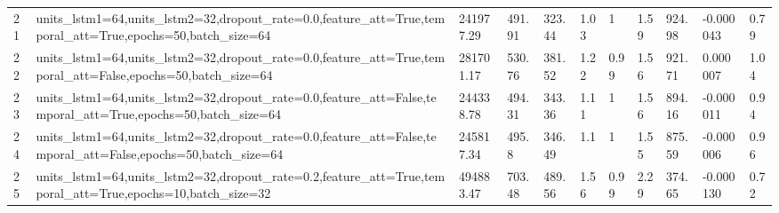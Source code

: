 \begin{longtable}{C{0.8cm} L{2cm} C{1.15cm} C{1.15cm} C{1.15cm} C{1.15cm} C{0.85cm} C{1.25cm} C{1.2cm} C{1.5cm} C{1.0cm}}
21 & units\_lstm1=64,\newline units\_lstm2=32,\newline dropout\_rate=0.0,\newline feature\_att=True,\newline temporal\_att=True,\newline epochs=50,\newline batch\_size=64 & 241977.29 & 491.91 & 323.44 & 1.03 & 1 & 1.59 & 924.98 & -0.000043 & 0.79 \\
22 & units\_lstm1=64,\newline units\_lstm2=32,\newline dropout\_rate=0.0,\newline feature\_att=True,\newline temporal\_att=False,\newline epochs=50,\newline batch\_size=64 & 281701.17 & 530.76 & 381.52 & 1.22 & 0.99 & 1.56 & 921.71 & 0.000007 & 1.04 \\
23 & units\_lstm1=64,\newline units\_lstm2=32,\newline dropout\_rate=0.0,\newline feature\_att=False,\newline temporal\_att=True,\newline epochs=50,\newline batch\_size=64 & 244338.78 & 494.31 & 343.36 & 1.11 & 1 & 1.56 & 894.16 & -0.000011 & 0.94 \\
24 & units\_lstm1=64,\newline units\_lstm2=32,\newline dropout\_rate=0.0,\newline feature\_att=False,\newline temporal\_att=False,\newline epochs=50,\newline batch\_size=64 & 245817.34 & 495.8 & 346.49 & 1.1 & 1 & 1.55 & 875.59 & -0.000006 & 0.96 \\
25 & units\_lstm1=64,\newline units\_lstm2=32,\newline dropout\_rate=0.2,\newline feature\_att=True,\newline temporal\_att=True,\newline epochs=10,\newline batch\_size=32 & 494883.47 & 703.48 & 489.56 & 1.56 & 0.99 & 2.29 & 374.65 & -0.000130 & 0.72 \\

\end{longtable}
